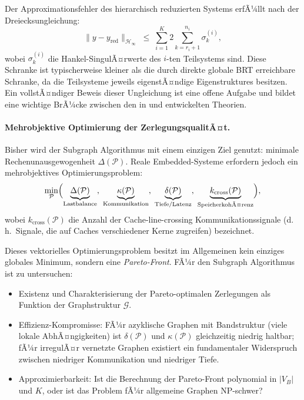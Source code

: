 ﻿\documentclass[12pt,a4paper]{article}
\theoremstyle{definition}
\begin{document}
Der Approximationsfehler des hierarchisch reduzierten Systems
erfÃ¼llt nach der Dreiecksungleichung:
\[
  \|y - y_{\mathrm{red}}\|_{\mathcal{H}_\infty}
  \;\leq\; \sum_{i=1}^K
  2 \sum_{k=r_i+1}^{n_i} \sigma_k^{(i)},
\]
wobei $\sigma_k^{(i)}$ die Hankel-SingulÃ¤rwerte des $i$-ten
Teilsystems sind. Diese Schranke ist typischerweise kleiner als
die durch direkte globale BRT erreichbare Schranke, da die
Teilsysteme jeweils eigenstÃ¤ndige Eigenstruktures besitzen.
Ein vollstÃ¤ndiger Beweis dieser Ungleichung ist eine offene Aufgabe
und bildet eine wichtige BrÃ¼cke zwischen den in 
und  entwickelten Theorien.

\paragraph{Mehrobjektive Optimierung der ZerlegungsqualitÃ¤t.}
Bisher wird der Subgraph Algorithmus mit einem einzigen Ziel genutzt:
minimale Rechenunausgewogenheit $\Delta(\mathcal{P})$. Reale
Embedded-Systeme erfordern jedoch ein mehrobjektives Optimierungsproblem:
\[
  \min_{\mathcal{P}} \Bigl(
    \underbrace{\Delta(\mathcal{P})}_{\text{Lastbalance}},\;
    \underbrace{\kappa(\mathcal{P})}_{\text{Kommunikation}},\;
    \underbrace{\delta(\mathcal{P})}_{\text{Tiefe/Latenz}},\;
    \underbrace{k_{\mathrm{cross}}(\mathcal{P})}_{\text{SpeicherkohÃ¤renz}}
  \Bigr),
\]
wobei $k_{\mathrm{cross}}(\mathcal{P})$ die Anzahl der Cache-line-crossing
Kommunikationssignale (d.\,h.\ Signale, die auf Caches verschiedener
Kerne zugreifen) bezeichnet.

Dieses vektorielles Optimierungsproblem besitzt im Allgemeinen kein
einziges globales Minimum, sondern eine \emph{Pareto-Front}.
FÃ¼r den Subgraph Algorithmus ist zu untersuchen:

\begin{itemize}[nosep]
  \item Existenz und Charakterisierung der Pareto-optimalen Zerlegungen
        als Funktion der Graphstruktur $\mathcal{G}$.
  \item Effizienz-Kompromisse: FÃ¼r azyklische Graphen mit
        Bandstruktur (viele lokale AbhÃ¤ngigkeiten) ist
        $\delta(\mathcal{P})$ und $\kappa(\mathcal{P})$ gleichzeitig
        niedrig haltbar; fÃ¼r irregulÃ¤r vernetzte Graphen existiert
        ein fundamentaler Widerspruch zwischen niedriger
        Kommunikation und niedriger Tiefe.
  \item Approximierbarkeit: Ist die Berechnung der Pareto-Front
        polynomial in $|V_B|$ und $K$, oder ist das Problem fÃ¼r
        allgemeine Graphen NP-schwer?
\end{itemize}
\end{document}
